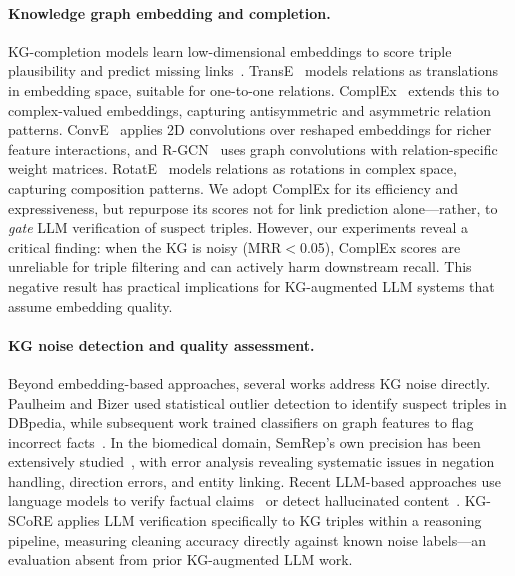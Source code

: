 \paragraph{Knowledge graph embedding and completion.}
KG-completion models learn low-dimensional embeddings to score triple plausibility and predict missing links~\cite{ji2021survey,hogan2021knowledge,rossi2021knowledge}. TransE~\cite{bordes2013irreflexive} models relations as translations in embedding space, suitable for one-to-one relations. ComplEx~\cite{trouillon2016complex,trouillon2017knowledge} extends this to complex-valued embeddings, capturing antisymmetric and asymmetric relation patterns. ConvE~\cite{dettmers2018convolutional} applies 2D convolutions over reshaped embeddings for richer feature interactions, and R-GCN~\cite{schlichtkrull2018modeling} uses graph convolutions with relation-specific weight matrices. RotatE~\cite{sun2019rotate} models relations as rotations in complex space, capturing composition patterns. We adopt ComplEx for its efficiency and expressiveness, but repurpose its scores not for link prediction alone---rather, to \emph{gate} LLM verification of suspect triples. However, our experiments reveal a critical finding: when the KG is noisy (MRR$<$0.05), ComplEx scores are unreliable for triple filtering and can actively harm downstream recall. This negative result has practical implications for KG-augmented LLM systems that assume embedding quality.

\paragraph{KG noise detection and quality assessment.}
Beyond embedding-based approaches, several works address KG noise directly. Paulheim and Bizer used statistical outlier detection to identify suspect triples in DBpedia, while subsequent work trained classifiers on graph features to flag incorrect facts~\cite{yao2021typing}. In the biomedical domain, SemRep's own precision has been extensively studied~\cite{kilicoglu2020broadcoverage}, with error analysis revealing systematic issues in negation handling, direction errors, and entity linking. Recent LLM-based approaches use language models to verify factual claims~\cite{min2023factscore} or detect hallucinated content~\cite{zhao2026survey}. KG-SCoRE applies LLM verification specifically to KG triples within a reasoning pipeline, measuring cleaning accuracy directly against known noise labels---an evaluation absent from prior KG-augmented LLM work.

